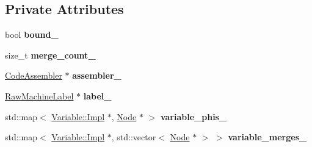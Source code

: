 \subsection*{Private Attributes}
\begin{DoxyCompactItemize}
\item 
bool {\bfseries bound\+\_\+}\hypertarget{classv8_1_1internal_1_1compiler_1_1_code_assembler_1_1_label_a57dffd97e998d5f4b8775c0919998418}{}\label{classv8_1_1internal_1_1compiler_1_1_code_assembler_1_1_label_a57dffd97e998d5f4b8775c0919998418}

\item 
size\+\_\+t {\bfseries merge\+\_\+count\+\_\+}\hypertarget{classv8_1_1internal_1_1compiler_1_1_code_assembler_1_1_label_af42e57ee6680da331dcc703b0fa0e781}{}\label{classv8_1_1internal_1_1compiler_1_1_code_assembler_1_1_label_af42e57ee6680da331dcc703b0fa0e781}

\item 
\hyperlink{classv8_1_1internal_1_1compiler_1_1_code_assembler}{Code\+Assembler} $\ast$ {\bfseries assembler\+\_\+}\hypertarget{classv8_1_1internal_1_1compiler_1_1_code_assembler_1_1_label_a7c342d9bb26d1c76b577afef13e5de3a}{}\label{classv8_1_1internal_1_1compiler_1_1_code_assembler_1_1_label_a7c342d9bb26d1c76b577afef13e5de3a}

\item 
\hyperlink{classv8_1_1internal_1_1compiler_1_1_raw_machine_label}{Raw\+Machine\+Label} $\ast$ {\bfseries label\+\_\+}\hypertarget{classv8_1_1internal_1_1compiler_1_1_code_assembler_1_1_label_a771eaffccca765654508798c57a148c7}{}\label{classv8_1_1internal_1_1compiler_1_1_code_assembler_1_1_label_a771eaffccca765654508798c57a148c7}

\item 
std\+::map$<$ \hyperlink{classv8_1_1internal_1_1compiler_1_1_code_assembler_1_1_variable_1_1_impl}{Variable\+::\+Impl} $\ast$, \hyperlink{classv8_1_1internal_1_1compiler_1_1_node}{Node} $\ast$ $>$ {\bfseries variable\+\_\+phis\+\_\+}\hypertarget{classv8_1_1internal_1_1compiler_1_1_code_assembler_1_1_label_aba782783aef40fc086fe54d928e70502}{}\label{classv8_1_1internal_1_1compiler_1_1_code_assembler_1_1_label_aba782783aef40fc086fe54d928e70502}

\item 
std\+::map$<$ \hyperlink{classv8_1_1internal_1_1compiler_1_1_code_assembler_1_1_variable_1_1_impl}{Variable\+::\+Impl} $\ast$, std\+::vector$<$ \hyperlink{classv8_1_1internal_1_1compiler_1_1_node}{Node} $\ast$ $>$ $>$ {\bfseries variable\+\_\+merges\+\_\+}\hypertarget{classv8_1_1internal_1_1compiler_1_1_code_assembler_1_1_label_ab18a3a61f4cc39d39e36fb61d39fe2a2}{}\label{classv8_1_1internal_1_1compiler_1_1_code_assembler_1_1_label_ab18a3a61f4cc39d39e36fb61d39fe2a2}

\end{DoxyCompactItemize}
